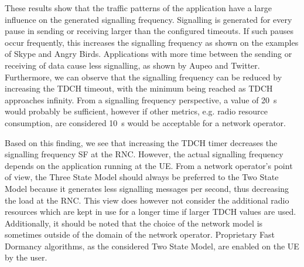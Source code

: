 These results show that the traffic patterns of the application have a large influence on the generated signalling frequency.
Signalling is generated for every pause in sending or receiving larger than the configured timeouts.
If such pauses occur frequently, this increases the signalling frequency as shown on the examples of Skype and Angry Birds.
Applications with more time between the sending or receiving of data cause less signalling, as shown by Aupeo and Twitter.
Furthermore, we can observe that the signalling frequency can be reduced by increasing the \gls{TDCH} timeout, with the minimum being reached as \gls{TDCH} approaches infinity.
From a signalling frequency perspective, a value of \SI{20}{\second} would probably be sufficient, however if other metrics, e.g. radio resource consumption, are considered \SI{10}{\second} would be acceptable for a network operator.

Based on this finding, we see that increasing the \gls{TDCH} timer decreases the signalling frequency \gls{SF} at the \gls{RNC}.
However, the actual signalling frequency depends on the application running at the \gls{UE}.
From a network operator's point of view, the Three State Model should always be preferred to the Two State Model because it generates less signalling messages per second, thus decreasing the load at the \gls{RNC}.
This view does however not consider the additional radio resources which are kept in use for a longer time if larger \gls{TDCH} values are used.
Additionally, it should be noted that the choice of the network model is sometimes outside of the domain of the network operator.
Proprietary Fast Dormancy algorithms, as the considered Two State Model, are enabled on the \gls{UE} by the user.

